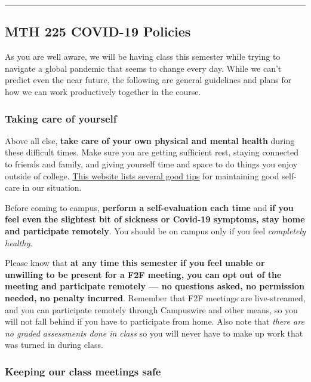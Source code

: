 \documentclass[]{article}
\begin{document}
\begin{center}\rule{0.5\linewidth}{\linethickness}\end{center}

\hypertarget{mth-225-covid-19-policies}{%
\subsection{MTH 225 COVID-19 Policies}\label{mth-225-covid-19-policies}}

As you are well aware, we will be having class this semester while
trying to navigate a global pandemic that seems to change every day.
While we can't predict even the near future, the following are general
guidelines and plans for how we can work productively together in the
course.

\hypertarget{taking-care-of-yourself}{%
\subsubsection{Taking care of yourself}\label{taking-care-of-yourself}}

Above all else, \textbf{take care of your own physical and mental
health} during these difficult times. Make sure you are getting
sufficient rest, staying connected to friends and family, and giving
yourself time and space to do things you enjoy outside of college.
\href{https://www.mayoclinichealthsystem.org/hometown-health/speaking-of-health/self-care-tips-during-the-covid-19-pandemic}{This
website lists several good tips} for maintaining good self-care in our
situation.

Before coming to campus, \textbf{perform a self-evaluation each time}
and \textbf{if you feel even the slightest bit of sickness or Covid-19
symptoms, stay home and participate remotely}. You should be on campus
only if you feel \emph{completely healthy}.

Please know that \textbf{at any time this semester if you feel unable or
unwilling to be present for a F2F meeting, you can opt out of the
meeting and participate remotely --- no questions asked, no permission
needed, no penalty incurred}. Remember that F2F meetings are
live-streamed, and you can participate remotely through Campuswire and
other means, so you will not fall behind if you have to participate from
home. Also note that \emph{there are no graded assessments done in
class} so you will never have to make up work that was turned in during
class.

\hypertarget{keeping-our-class-meetings-safe}{%
\subsubsection{Keeping our class meetings
safe}\label{keeping-our-class-meetings-safe}}
\end{document}
